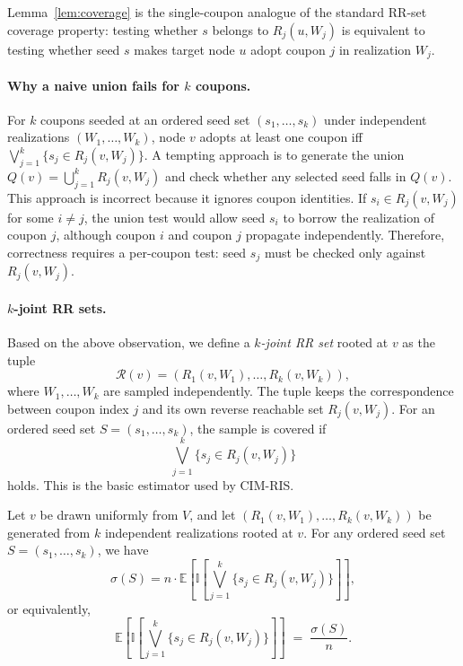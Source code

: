 \documentclass[sigconf]{acmart}
\newcommand{\CIMRIS}{\textsc{CIM-RIS}}
\newcommand{\E}{\mathbb{E}}
\newcommand{\I}{\mathbb{I}}
\begin{document}
Lemma~\ref{lem:coverage} is the single-coupon analogue of the standard
RR-set coverage property: testing whether $s$ belongs to
$R_j(u,W_j)$ is equivalent to testing whether seed $s$ makes target
node $u$ adopt coupon $j$ in realization $W_j$.

\paragraph{Why a naive union fails for $k$ coupons.}
For $k$ coupons seeded at an ordered seed set $(s_1, \ldots, s_k)$ under independent realizations
$(W_1, \ldots, W_k)$, node $v$ adopts at least one coupon iff
$\bigvee_{j=1}^k \{s_j \in R_j(v, W_j)\}$.
A tempting approach is to generate the union
$Q(v)=\bigcup_{j=1}^k R_j(v,W_j)$ and check whether any selected seed
falls in $Q(v)$.
This approach is incorrect because it ignores coupon identities.
If $s_i\in R_j(v,W_j)$ for some $i\neq j$, the union test would allow
seed $s_i$ to borrow the realization of coupon $j$, although coupon
$i$ and coupon $j$ propagate independently.
Therefore, correctness requires a per-coupon test: seed $s_j$ must be
checked only against $R_j(v,W_j)$.

\paragraph{$k$-joint RR sets.}
Based on the above observation, we define a \emph{$k$-joint RR set}
rooted at $v$ as the tuple
\[
  \mathcal{R}(v)=(R_1(v,W_1),\ldots,R_k(v,W_k)),
\]
where $W_1,\ldots,W_k$ are sampled independently.
The tuple keeps the correspondence between coupon index $j$ and its
own reverse reachable set $R_j(v,W_j)$.
For an ordered seed set $S=(s_1,\ldots,s_k)$, the sample is covered if
\[
  \bigvee_{j=1}^k \{s_j\in R_j(v,W_j)\}
\]
holds.
This is the basic estimator used by \CIMRIS{}.

\begin{lemma}[Unbiasedness]
\label{lem:unbiased}
Let $v$ be drawn uniformly from $V$, and let
$(R_1(v, W_1), \ldots, R_k(v, W_k))$ be generated from $k$ independent
realizations rooted at $v$.
For any ordered seed set $S=(s_1,\ldots,s_k)$, we have
\[
  \sigma(S)
  = n\cdot
  \E\!\left[
    \I\!\left[\bigvee_{j=1}^{k} \{s_j \in R_j(v,W_j)\}\right]
  \right],
\]
or equivalently,
\[
  \E\!\left[
    \I\!\left[\bigvee_{j=1}^{k} \{s_j \in R_j(v,W_j)\}\right]
  \right]
  \;=\; \frac{\sigma(S)}{n}.
\]
\end{lemma}
\end{document}
